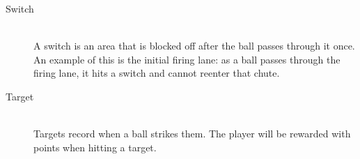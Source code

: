 \documentclass[fontsize=12pt,
               paper=a4,
               twoside=false,
               parskip=half,
               ]{scrartcl}
\begin{document}
\begin{description}
\item[Switch] \hfill \\
A switch is an area that is blocked off after the ball passes through it once. An example of this is the initial firing lane: as a ball passes through the firing lane, it hits a switch and cannot reenter that chute. %

\item[Target] \hfill \\
Targets record when a ball strikes them. The player will be rewarded with points when hitting a target.

\end{description}
\end{document}
